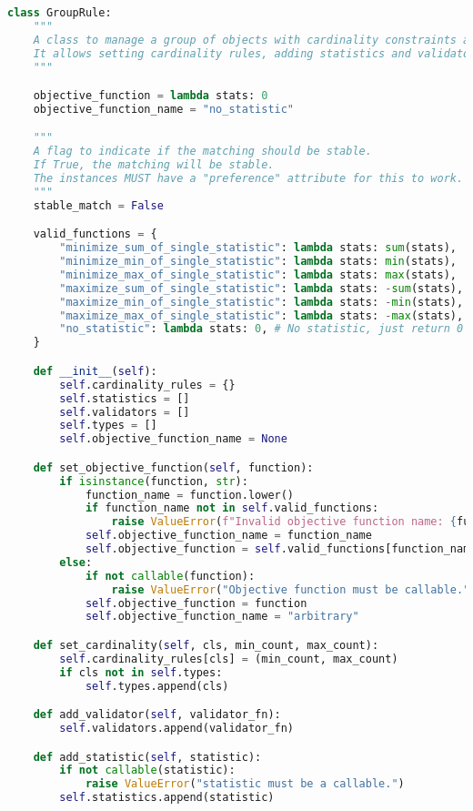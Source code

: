 \begin{apendicesenv}
\begin{lstlisting}[language=Python, caption={GroupRule and Group Class Source Code}]
class GroupRule:
    """
    A class to manage a group of objects with cardinality constraints and validation.
    It allows setting cardinality rules, adding statistics and validators, and defining objective functions.
    """

    objective_function = lambda stats: 0
    objective_function_name = "no_statistic"

    """
    A flag to indicate if the matching should be stable.
    If True, the matching will be stable.
    The instances MUST have a "preference" attribute for this to work.
    """
    stable_match = False

    valid_functions = {
        "minimize_sum_of_single_statistic": lambda stats: sum(stats),
        "minimize_min_of_single_statistic": lambda stats: min(stats),
        "minimize_max_of_single_statistic": lambda stats: max(stats),
        "maximize_sum_of_single_statistic": lambda stats: -sum(stats),
        "maximize_min_of_single_statistic": lambda stats: -min(stats),
        "maximize_max_of_single_statistic": lambda stats: -max(stats),
        "no_statistic": lambda stats: 0, # No statistic, just return 0
    }

    def __init__(self):
        self.cardinality_rules = {}
        self.statistics = []
        self.validators = []
        self.types = []
        self.objective_function_name = None

    def set_objective_function(self, function):
        if isinstance(function, str):
            function_name = function.lower()
            if function_name not in self.valid_functions:
                raise ValueError(f"Invalid objective function name: {function_name}")
            self.objective_function_name = function_name
            self.objective_function = self.valid_functions[function_name]
        else:
            if not callable(function):
                raise ValueError("Objective function must be callable.")
            self.objective_function = function
            self.objective_function_name = "arbitrary"

    def set_cardinality(self, cls, min_count, max_count):
        self.cardinality_rules[cls] = (min_count, max_count)
        if cls not in self.types:
            self.types.append(cls)

    def add_validator(self, validator_fn):
        self.validators.append(validator_fn)

    def add_statistic(self, statistic):
        if not callable(statistic):
            raise ValueError("statistic must be a callable.")
        self.statistics.append(statistic)


\end{lstlisting}
\end{apendicesenv}
